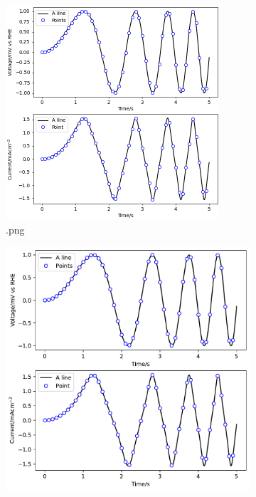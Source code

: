     \begin{figure}
        \begin{subfigure}[t]{0.49\textwidth}
        \includegraphics[width=\linewidth]{./figs/example_1.png}
        \caption{.png}
        \label{figures:fig:exmaple:2:png}
        \end{subfigure}
        \hfill
        \begin{subfigure}[t]{0.49\textwidth}
        \includegraphics[width=\linewidth]{./figs/example_1.pdf}

\end{subfigure}
\end{figure}
